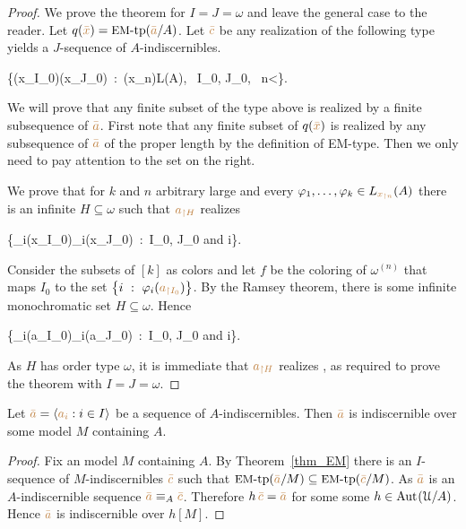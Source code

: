 \documentclass[creche.tex]{subfiles}
\begin{document}
\begin{proof}
We prove the theorem for $I=J=\omega$ and leave the general case to the reader.
Let $q({\color{brown}\bar x})=\mbox{{\small EM}-tp}({\color{brown}\bar a}/A)$.
Let ${\color{brown}\bar c}$ be any realization of the following type yields a $J$-sequence of $A$-indiscernibles.

{\cup}
{\Big\{\phi({\mr x_{\restriction I_0}})\iff\phi({\mr x_{\restriction J_0}})\ :\  \phi({\mr x_{\restriction n}})\in L(A), \ I_0, J_0\in{}, \ n<\omega\Big\}.}

We will prove that any finite subset of the type above is realized by a finite subsequence of ${\color{brown}\bar a}$.
First note that any finite subset of $q({\color{brown}\bar x})$ is realized by any subsequence of ${\color{brown}\bar a}$ of the proper length by the definition of EM-type.
Then we only need to pay attention to the set on the right.

We prove that for $k$ and $n$ arbitrary large and every $\varphi_1,\dots,\varphi_k\in L_{\color{brown} x_{\restriction n}}(A)$ there is an infinite $H\subseteq\omega$ such that ${\color{brown} a_{\restriction H}}$ realizes

\ceq{\ssf{\#}}
{}
{\Big\{\phi_i({\mr x_{\restriction I_0}})\iff\phi_i({\mr x_{\restriction J_0}})\ :\  I_0, J_0\in{}\textrm{ and } i\in[k]\Big\}.}

Consider the subsets of $[k]$ as colors and let $f$ be the coloring of $\omega^{(n)}$ that maps $I_0$ to the set $\big\{i\ :\ \varphi_i({\color{brown} a_{\restriction I_0}})\big\}$.
By the Ramsey theorem,
there is some infinite monochromatic set $H\subseteq\omega$.
Hence

\ceq{}
{}
{\Big\{\phi_i({\mr a_{\restriction I_0}})\iff\phi_i({\mr a_{\restriction J_0}})\ :\  I_0, J_0\in{}\textrm{ and } i\in[k]\Big\}.}

As $H$ has order type $\omega$,
it is immediate that ${\color{brown} a_{\restriction H}}$ realizes \ssf{\#},
as required to prove the theorem with $I=J=\omega$.
\end{proof}


\begin{proposition}\label{prop_indiscernibles_set_model}
Let ${\color{brown}\bar a}=\langle{\color{brown}a_i}:i\in I\rangle$ be a sequence of $A$-indiscernibles.
Then ${\color{brown}\bar a}$ is indiscernible over some model $M$ containing $A$.
\end{proposition}

\begin{proof}
Fix an model $M$ containing $A$.
By Theorem~\ref{thm_EM} there is an $I$-sequence of $M$-indiscernibles ${\color{brown}\bar c}$ such that $\mbox{{\small EM}-tp}({\color{brown}\bar a}/M)\subseteq\mbox{{\small EM}-tp}({\color{brown}\bar c}/M)$.
As ${\color{brown}\bar a}$ is an $A$-indiscernible sequence ${\color{brown}\bar a}\equiv_A{\color{brown}\bar c}$.
Therefore $h\,{\color{brown}\bar c}={\color{brown}\bar a}$ for some some $h\in{\rm Aut\kern.15ex}(\EuScript U/A)$.
Hence ${\color{brown}\bar a}$ is indiscernible over $h[M]$.
\end{proof}
\end{document}
